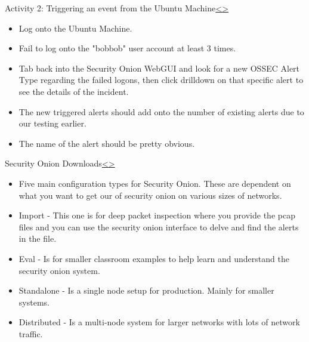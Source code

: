 \documentclass[12pt]{article}
\newenvironment{instructionblock}{\Large\bgroup}{\egroup}
\newcommand{\bi}{\begin{itemize}}
\newcommand{\ei}{\end{itemize}}
\begin{document}
\pagebreak

\begin{slide}{Activity 2: Triggering an event from the Ubuntu Machine}{\hyperref[slide 8]{\textless}\hyperref[slide 10]{\textgreater}}
	\begin{instructionblock}
    \bi
				\item Log onto the Ubuntu Machine.
			    \item Fail to log onto the "bobbob" user account at least 3 times.
				\item Tab back into the Security Onion WebGUI and look for a new OSSEC Alert Type regarding the failed logons, then click drilldown on that specific alert to see the details of the incident.
	\ei			
	\end{instructionblock}
\end{slide}
\vfill
\bi

\item The new triggered alerts should add onto the number of existing alerts due to our testing earlier.

\item The name of the alert should be pretty obvious.


\ei

\pagebreak
\begin{slide}{Security Onion Downloads}{\hyperref[slide 10]{\textless}\hyperref[slide 12]{\textgreater}}
	\begin{instructionblock}
		\bi 
			\item Five main configuration types for Security Onion. These are dependent on what you want to get our of security onion on various sizes of networks.
			\item Import - This one is for deep packet inspection where you provide the pcap files and you can use the security onion interface to delve and find the alerts in the file.
            \item Eval - Is for smaller classroom examples to help learn and understand the security onion system.
            \item Standalone - Is a single node setup for production. Mainly for smaller systems.
            \item Distributed - Is a multi-node system for larger networks with lots of network traffic.
		\ei 
		
	\end{instructionblock}
\end{slide}
\vfill
\end{document}
